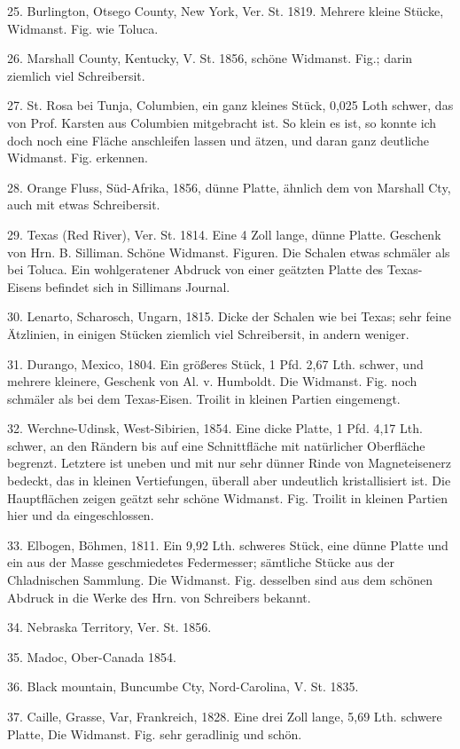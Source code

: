 \documentclass[a4paper, 11pt, oneside]{article}
\begin{document}
25. Burlington, Otsego County, New York, Ver. St. 1819. Mehrere kleine Stücke, Widmanst. Fig. wie Toluca.

26. Marshall County, Kentucky, V. St. 1856, schöne Widmanst. Fig.; darin ziemlich viel Schreibersit.

27. St. Rosa bei Tunja, Columbien, ein ganz kleines Stück, 0,025 Loth schwer, das von Prof. Karsten aus Columbien mitgebracht ist. So klein es ist, so konnte ich doch noch eine Fläche anschleifen lassen und ätzen, und daran ganz deutliche Widmanst. Fig. erkennen.

28. Orange Fluss, Süd-Afrika, 1856, dünne Platte, ähnlich dem von Marshall Cty, auch mit etwas Schreibersit.

29. Texas (Red River), Ver. St. 1814. Eine 4 Zoll lange, dünne Platte. Geschenk von Hrn. B. Silliman. Schöne Widmanst. Figuren. Die Schalen etwas schmäler als bei Toluca. Ein wohlgeratener Abdruck von einer geätzten Platte des Texas-Eisens befindet sich in Sillimans Journal.

30. Lenarto, Scharosch, Ungarn, 1815. Dicke der Schalen wie bei Texas; sehr feine Ätzlinien, in einigen Stücken ziemlich viel Schreibersit, in andern weniger.

31. Durango, Mexico, 1804. Ein größeres Stück, 1 Pfd. 2,67 Lth. schwer, und mehrere kleinere, Geschenk von Al. v. Humboldt. Die Widmanst. Fig. noch schmäler als bei dem Texas-Eisen. Troilit in kleinen Partien eingemengt.

32. Werchne-Udinsk, West-Sibirien, 1854. Eine dicke Platte, 1 Pfd. 4,17 Lth. schwer, an den Rändern bis auf eine Schnittfläche mit natürlicher Oberfläche begrenzt. Letztere ist uneben und mit nur sehr dünner Rinde von Magneteisenerz bedeckt, das in kleinen Vertiefungen, überall aber undeutlich kristallisiert ist. Die Hauptflächen zeigen geätzt sehr schöne Widmanst. Fig. Troilit in kleinen Partien hier und da eingeschlossen.

33. Elbogen, Böhmen, 1811. Ein 9,92 Lth. schweres Stück, eine dünne Platte und ein aus der Masse geschmiedetes Federmesser; sämtliche Stücke aus der Chladnischen Sammlung. Die Widmanst. Fig. desselben sind aus dem schönen Abdruck in die Werke des Hrn. von Schreibers bekannt.

34. Nebraska Territory, Ver. St. 1856.

35. Madoc, Ober-Canada 1854.

36. Black mountain, Buncumbe Cty, Nord-Carolina, V. St. 1835.

37. Caille, Grasse, Var, Frankreich, 1828. Eine drei Zoll lange, 5,69 Lth. schwere Platte, Die Widmanst. Fig. sehr geradlinig und schön.
\end{document}
